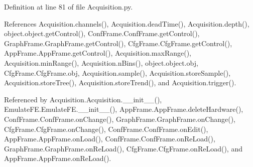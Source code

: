 Definition at line 81 of file Acquisition.\+py.



References Acquisition.\+channels(), Acquisition.\+dead\+Time(), Acquisition.\+depth(), object.\+object.\+get\+Control(), Conf\+Frame.\+Conf\+Frame.\+get\+Control(), Graph\+Frame.\+Graph\+Frame.\+get\+Control(), Cfg\+Frame.\+Cfg\+Frame.\+get\+Control(), App\+Frame.\+App\+Frame.\+get\+Control(), Acquisition.\+max\+Range(), Acquisition.\+min\+Range(), Acquisition.\+n\+Bins(), object.\+object.\+obj, Cfg\+Frame.\+Cfg\+Frame.\+obj, Acquisition.\+sample(), Acquisition.\+store\+Sample(), Acquisition.\+store\+Tree(), Acquisition.\+store\+Trend(), and Acquisition.\+trigger().



Referenced by Acquisition.\+Acquisition.\+\_\+\+\_\+init\+\_\+\+\_\+(), Emulate\+F\+E.\+Emulate\+F\+E.\+\_\+\+\_\+init\+\_\+\+\_\+(), App\+Frame.\+App\+Frame.\+delete\+Hardware(), Conf\+Frame.\+Conf\+Frame.\+on\+Change(), Graph\+Frame.\+Graph\+Frame.\+on\+Change(), Cfg\+Frame.\+Cfg\+Frame.\+on\+Change(), Conf\+Frame.\+Conf\+Frame.\+on\+Edit(), App\+Frame.\+App\+Frame.\+on\+Load(), Conf\+Frame.\+Conf\+Frame.\+on\+Re\+Load(), Graph\+Frame.\+Graph\+Frame.\+on\+Re\+Load(), Cfg\+Frame.\+Cfg\+Frame.\+on\+Re\+Load(), and App\+Frame.\+App\+Frame.\+on\+Re\+Load().


